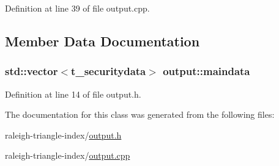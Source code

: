 Definition at line 39 of file output.\+cpp.



\subsection{Member Data Documentation}
\subsubsection[{\texorpdfstring{maindata}{maindata}}]{\setlength{\rightskip}{0pt plus 5cm}std\+::vector$<${\bf t\+\_\+securitydata}$>$ output\+::maindata}\hypertarget{classoutput_afd54f0a8e1b199c6f12990edca6b0965}{}\label{classoutput_afd54f0a8e1b199c6f12990edca6b0965}


Definition at line 14 of file output.\+h.



The documentation for this class was generated from the following files\+:\begin{DoxyCompactItemize}
\item 
raleigh-\/triangle-\/index/\hyperlink{output_8h}{output.\+h}\item 
raleigh-\/triangle-\/index/\hyperlink{output_8cpp}{output.\+cpp}\end{DoxyCompactItemize}
